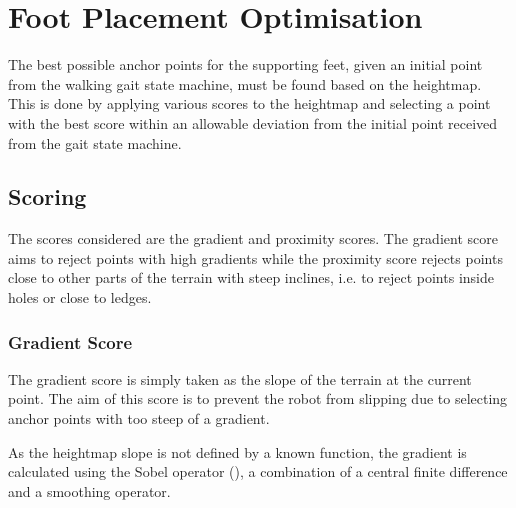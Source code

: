 \chapter{Foot Placement Optimisation} \label{chap:effector-placement}
The best possible anchor points for the supporting feet, given an initial point from the walking
gait state machine, must be found based on the heightmap. This is done by applying various
scores to the heightmap and selecting a point with the best score within an allowable
deviation from the initial point received from the gait state machine.

\section{Scoring}
    The scores considered are the gradient and proximity scores. The gradient score aims to reject points with high gradients while the proximity score rejects points close
    to other parts of the terrain with steep inclines, i.e. to reject points inside holes or close to ledges.
    \subsection{Gradient Score}
        The gradient score is simply taken as the slope of the terrain at the current point. The aim of this score is to prevent the robot from slipping due to
        selecting anchor points with too steep of a gradient.
        
        As the heightmap slope is not defined by a known function, the gradient is calculated using the Sobel
        operator (\cite{sobel2014}), a combination of a central finite difference and a smoothing operator.
        
